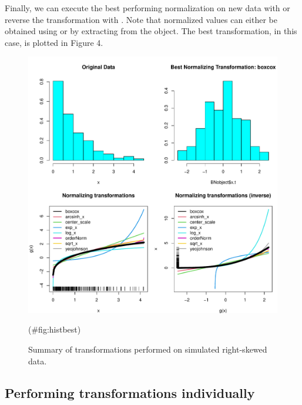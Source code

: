 Finally, we can execute the best performing normalization on new data
with  or reverse the
transformation with
.
Note that normalized values can either be obtained using 
or by extracting  from the object. The best transformation, in
this case, is plotted in Figure 4.

\begin{Schunk}
\begin{figure}

{\centering \includegraphics[width=1\linewidth]{figs/histbest-1} 

}

\caption[Summary of transformations performed on simulated right-skewed data]{Summary of transformations performed on simulated right-skewed data.}(\#fig:histbest)
\end{figure}
\end{Schunk}

\hypertarget{performing-transformations-individually}{%
\subsection{Performing transformations
individually}\label{performing-transformations-individually}}

